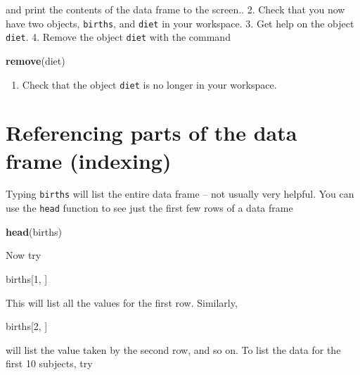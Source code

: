 \documentclass[
]{book}
\newenvironment{Shaded}{\begin{snugshade}}{\end{snugshade}}
\newcommand{\DecValTok}[1]{\textcolor[rgb]{0.00,0.00,0.81}{#1}}
\newcommand{\FunctionTok}[1]{\textcolor[rgb]{0.13,0.29,0.53}{\textbf{#1}}}
\newcommand{\NormalTok}[1]{#1}
\providecommand{\tightlist}{%
  \setlength{\itemsep}{0pt}\setlength{\parskip}{0pt}}
\begin{document}
and print the contents of the data frame to the screen..
2. Check that you now have two objects, \texttt{births}, and \texttt{diet} in your workspace.
3. Get help on the object \texttt{diet}.
4. Remove the object \texttt{diet} with the command

\begin{Shaded}
\begin{Highlighting}[]
\FunctionTok{remove}\NormalTok{(diet)}
\end{Highlighting}
\end{Shaded}

\begin{enumerate}
\def\labelenumi{\arabic{enumi}.}
\setcounter{enumi}{4}
\tightlist
\item
  Check that the object \texttt{diet} is no longer in your workspace.
\end{enumerate}

\section{Referencing parts of the data frame (indexing)}\label{referencing-parts-of-the-data-frame-indexing}

Typing \texttt{births} will list the entire data frame -- not usually
very helpful. You can use the \texttt{head} function to see just the
first few rows of a data frame

\begin{Shaded}
\begin{Highlighting}[]
\FunctionTok{head}\NormalTok{(births)}
\end{Highlighting}
\end{Shaded}

Now try

\begin{Shaded}
\begin{Highlighting}[]
\NormalTok{births[}\DecValTok{1}\NormalTok{, ]}
\end{Highlighting}
\end{Shaded}

This will list all the values for the first row. Similarly,

\begin{Shaded}
\begin{Highlighting}[]
\NormalTok{births[}\DecValTok{2}\NormalTok{, ]}
\end{Highlighting}
\end{Shaded}

will list the value taken by the second row, and so on.
To list the data for the first 10 subjects, try
\end{document}
